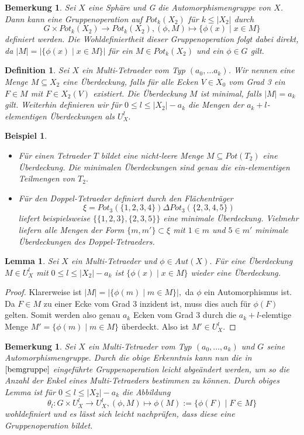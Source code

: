 \documentclass[12pt,titlepage,twoside,cleardoublepage]{article}
\theoremstyle{nummermitklammern}
\newtheorem{lemma}[temp]{Lemma}
\newtheorem{bsp}[temp]{Beispiel}
\newtheorem{definition}[temp]{Definition}
\newtheorem{bemerkung}[temp]{Bemerkung}
\newtheorem{definition}[zahl]{Definition}
\newtheorem{lemma}[zahl]{Lemma}
\newtheorem{bsp}[zahl]{Beispiel}
\newtheorem{bemerkung}[zahl]{Bemerkung}
\numberwithin{equation}{section}
\begin{document}
\begin{bemerkung}\label{bemgruppe}
Sei $X$ eine Sphäre und G die Automorphismengruppe von $X$. Dann kann eine Gruppenoperation auf $Pot_k(X_2)$ für $k \leq \vert X_2 \vert  $ durch 
\[
G\times Pot_k(X_2) \to Pot_k(X_2),(\phi , M)\mapsto \{\phi(x)\mid x\in M\}
\]
definiert werden. Die Wohldefiniertheit dieser Gruppenoperation folgt dabei direkt, da $\vert M\vert=\vert\{\phi (x)\mid x\in M\}\vert$ für ein $M\in Pot_k(X_2)$ und ein $\phi\in G$ gilt.
\end{bemerkung}
\begin{definition}
Sei $X$ ein Multi-Tetraeder vom Typ $(a_0,\ldots a_k)$. Wir nennen eine Menge $M\subseteq X_2$ eine \emph{Überdeckung}, falls für alle Ecken $V\in X_0$ vom Grad 3 ein $F\in M$ mit $F\in X_2(V)$ existiert. Die Überdeckung $M$ ist \emph{minimal}, falls $\vert M\vert=a_k$ gilt.
Weiterhin definieren wir für $0\leq l\leq \vert X_2\vert -a_k$ die Mengen der $a_k+l$-elementigen Überdeckungen als
 $U_X^l.$ 
\end{definition}
\begin{bsp}
\begin{itemize}
\item Für einen Tetraeder $T$ bildet eine nicht-leere Menge $ M \subseteq Pot(T_2)$ eine Überdeckung. Die minimalen Überdeckungen sind genau die ein-elementigen Teilmengen von $T_2.$
\item Für den Doppel-Tetraeder definiert durch den Flächenträger 
\[
\xi=Pot_3(\{1,2,3,4\})\Delta Pot_3(\{2,3,4,5\})
\]
liefert beispielsweise $\{\{1,2,3\},\{2,3,5\}\}$ eine minimale Überdeckung. Vielmehr liefern alle Mengen der Form $\{m,m'\}\subset \xi$ mit $1\in m$ und $5\in m'$ minimale Überdeckungen des Doppel-Tetraeders.
\end{itemize}
\end{bsp}
\begin{lemma}
Sei $X$ ein Multi-Tetraeder und $\phi \in Aut(X).$ Für eine Überdeckung $M\in U_X^l$ mit  $0\leq l\leq \vert X_2\vert -a_k$ ist $\{\phi(x)\mid x\in M\}$ wieder eine Überdeckung. \end{lemma}
\begin{proof}
Klarerweise ist $\vert M\vert =\vert\{\phi(m)\mid m\in M\}\vert,$ da $\phi$ ein Automorphismus ist.
 Da $F\in M$ zu einer Ecke vom Grad 3 inzident ist, muss dies auch für $\phi(F)$ gelten. Somit werden also genau $a_k$ Ecken vom Grad 3 durch die $a_k+l$-elemtige Menge $M'=\{\phi(m)\mid m\in M\}$ überdeckt. Also ist $M'\in U^l_X.$
\end{proof}
\begin{bemerkung}
Sei $X$ ein Multi-Tetraeder vom Typ $(a_0,\ldots ,a_k)$ und $G$ seine Automorphismengruppe.
Durch die obige Erkenntnis kann nun die in $\Cref{bemgruppe}$ eingeführte Gruppenoperation leicht abgeändert werden, um so die Anzahl der Enkel eines Multi-Tetraeders bestimmen zu können. Durch obiges Lemma ist für $0\leq l\leq \vert X_2 \vert -a_k$ die Abbildung
\[
\theta_l: G\times U_X^l \to U_X^l, (\phi, M)\mapsto \phi(M):=\{\phi(F)\mid F\in M\}
\] 
wohldefiniert und es lässt sich leicht nachprüfen, dass diese eine Gruppenoperation bildet.
\end{bemerkung}
\end{document}
